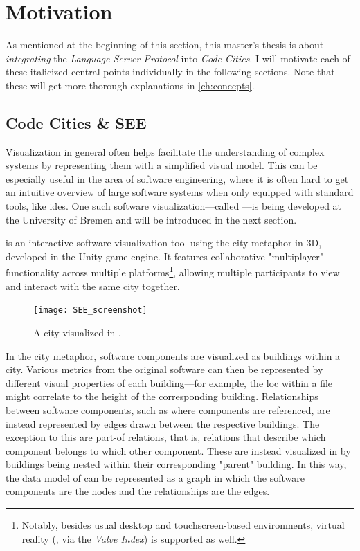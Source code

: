 \documentclass[../thesis]{subfiles}
\begin{document}
\section{Motivation}
As mentioned at the beginning of this section, this master's thesis is about \emph{integrating} the \emph{Language Server Protocol} into \emph{Code Cities}.
I will motivate each of these italicized central points individually in the following sections.
Note that these will get more thorough explanations in \cref{ch:concepts}.

\subsection{Code Cities \& SEE}\label{subsec:see}
Visualization in general often helps facilitate the understanding of complex systems by representing them with a simplified visual model.
This can be especially useful in the area of software engineering, where it is often hard to get an intuitive overview of large software systems when only equipped with standard tools, like \glspl{ide}.
One such software visualization---called \SEE{}---is being developed at the University of Bremen and will be introduced in the next section.

\SEE{} is an interactive software visualization tool using the \gls*{city} metaphor in 3D, developed in the {Unity} game engine.
It features collaborative "multiplayer" functionality across multiple platforms\footnote{
	Notably, besides usual desktop and touchscreen-based environments, virtual reality (\eg, via the \emph{Valve Index}) is supported as well.
}, allowing multiple participants to view and interact with the same \gls*{city} together.

\begin{figure}[hbtp]
	\centering
	\texttt{[image: SEE\_screenshot]}
	\caption{A \gls{city} visualized in \SEE{}.}\label{fig:city}
\end{figure}

In the \gls{city} metaphor, software components are visualized as buildings within a city.
Various metrics from the original software can then be represented by different visual properties of each building---for example, the \gls{loc} within a file might correlate to the height of the corresponding building.
Relationships between software components, such as where components are referenced, are instead represented by edges drawn between the respective buildings.
The exception to this are part-of relations, that is, relations that describe which component belongs to which other component.
These are instead visualized in \SEE{} by buildings being nested within their corresponding "parent" building.
In this way, the data model of \SEE{} can be represented as a graph in which the software components are the nodes and the relationships are the edges.
\end{document}
